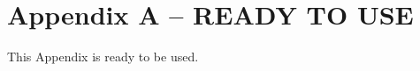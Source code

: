 

\chapter{Appendix A -- READY TO USE}\label{app:covers_showcase}

This Appendix is ready to be used.


